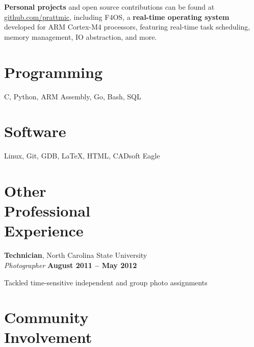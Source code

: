 \documentclass[margin,line,letterpaper]{resume}
\begin{document}
\begin{resume}
    \textbf{Personal projects} and open source contributions can be found at \href{http://github.com/prattmic}{github.com/prattmic},
    including F4OS, a \textbf{real-time operating system} developed for ARM Cortex-M4 processors, featuring real-time task scheduling,
    memory management, IO abstraction, and more.


    \section{\mysidestyle Programming}
    C, Python, ARM Assembly, Go, Bash, SQL
    \vspace{-5mm}

    \section{\mysidestyle Software}
    Linux, Git, GDB, \LaTeX, HTML, CADsoft Eagle


    \section{\mysidestyle Other\\Professional\\Experience}

    \textbf{Technician}, North Carolina State University \vspace{2mm}\\\vspace{1mm}%
    \textsl{Photographer} \hfill \textbf{August 2011 -- May 2012}\vspace{-3mm}\\\vspace{-1mm}%
    \begin{list2}
    \item Tackled time-sensitive independent and group photo assignments
    \end{list2}\vspace{-1.5mm}

    \section{\mysidestyle Community\\Involvement}



\end{resume}
\end{document}
